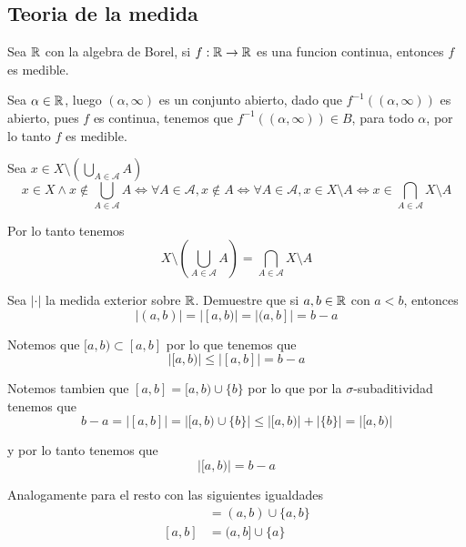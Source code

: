 \documentclass[../main.tex]{subfiles}
\begin{document}
\subsection{Teoria de la medida}
\begin{problem}
  Sea $\mathbb{R}$ con la algebra de Borel, si $f : \mathbb{R} \to \mathbb{R}$ es una funcion continua, entonces $f$ es medible.
\end{problem}
\begin{solution}
  Sea $\alpha \in \mathbb{R}$, luego $(\alpha, \infty)$ es un conjunto abierto, dado que $f^{-1}((\alpha, \infty))$ es abierto, pues $f$ es continua, tenemos que $f^{-1}((\alpha, \infty)) \in B$, para todo $\alpha$, por lo tanto $f$ es medible.
\end{solution}

\begin{solution}
Sea $x \in X \setminus (\bigcup_{A \in \mathcal{A}} A)$
\begin{equation*}
  x \in X \land x \notin \bigcup_{A \in \mathcal{A}} A \iff \forall A \in \mathcal{A}, x \notin A \iff \forall A \in \mathcal{A}, x \in X \setminus A \iff x \in \bigcap_{A \in \mathcal{A}} X \setminus A
\end{equation*}

Por lo tanto tenemos
\begin{equation*}
  X \setminus (\bigcup_{A \in \mathcal{A}} A) = \bigcap_{A \in \mathcal{A}} X \setminus A
\end{equation*}
\end{solution}

\begin{problem}
  Sea $|\cdot|$ la medida exterior sobre $\mathbb{R}$. Demuestre que si $a, b \in \mathbb{R}$ con $a < b$, entonces
  \begin{equation*}
    |(a, b)| = |[a, b)| = |(a, b]| = b - a
  \end{equation*}
\end{problem}
\begin{solution}
  Notemos que $[a, b) \subset [a, b]$ por lo que tenemos que
  \begin{equation*}
    |[a, b)| \leq |[a, b]| = b - a
  \end{equation*}

  Notemos tambien que $[a, b] = [a, b) \cup \{b\}$ por lo que por la $\sigma$-subaditividad tenemos que
  \begin{equation*}
    b - a = |[a, b]| = |[a, b) \cup \{b\}| \leq |[a, b)| + |\{b\}| = |[a, b)|
  \end{equation*}

  y por lo tanto tenemos que
  \begin{equation*}
    |[a, b)| = b - a
  \end{equation*}

  Analogamente para el resto con las siguientes igualdades
  \begin{align*}
    [a, b] &= (a, b) \cup \{a, b\}\\
    [a, b] &= (a, b] \cup \{a\}
  \end{align*}
\end{solution}
\end{document}

